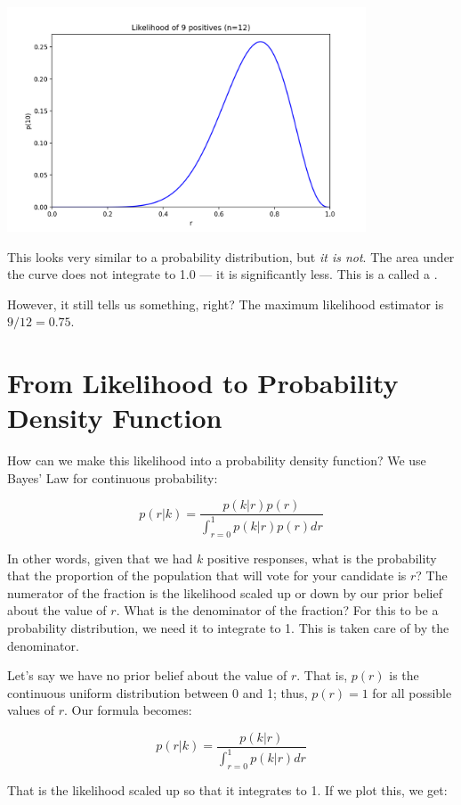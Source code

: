 \includegraphics[width=0.8\textwidth]{likelihood.png}

This looks very similar to a probability distribution, but \emph{it is not}.  The area under the curve does not integrate to 1.0 --- it is significantly less. This is a called a .

However,  it still tells us something, right?  The maximum likelihood estimator is $9/12 = 0.75$.

\section{From Likelihood to Probability Density Function}

How can we make this likelihood into a probability density function?  We use Bayes' Law for continuous probability:

$$p(r|k)  = \frac{p(k | r) p(r)}{\int_{r = 0}^{1} p(k | r) p(r) dr}$$

In other words, given that we had $k$ positive responses,  what is the probability that the proportion of the population that will vote for your candidate is $r$?   The numerator of the fraction is the likelihood scaled up or down by our prior belief about the value of $r$.    What is the denominator of the fraction?  For this to be a probability distribution,  we need it to integrate to 1.  This is taken care of by the denominator.

Let's say we have no prior belief about the value of $r$.   That is, $p(r)$ is the continuous uniform distribution between 0 and 1; thus, $p(r) = 1$ for all possible values of $r$.  Our formula becomes:

$$p(r|k)  = \frac{p(k | r)}{\int_{r = 0}^{1} p(k | r) dr}$$

That is the likelihood scaled up so that it integrates to 1.  If we plot this, we get:

